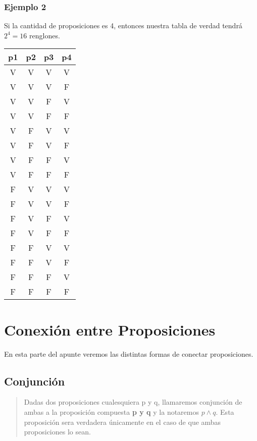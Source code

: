\documentclass[a4paper,11pt,oneside,titlepage,final]{scrartc}
\begin{document}
\subsubsection*{Ejemplo 2}

Si la cantidad de proposiciones es 4, entonces nuestra tabla de verdad tendrá $2^{4} = 16$ renglones.\\ 

\begin{tabular}{|c|c|c|c|}
\hline 
p1 & p2 & p3 & p4 \\ 
\hline 
V & V & V & V \\ 
\hline 
V & V & V & F \\ 
\hline 
V & V & F & V \\ 
\hline 
V & V & F & F \\ 
\hline 
V & F & V & V \\ 
\hline 
V & F & V & F \\ 
\hline 
V & F & F & V \\ 
\hline 
V & F & F & F \\ 
\hline 
F & V & V & V \\ 
\hline 
F & V & V & F \\ 
\hline 
F & V & F & V \\ 
\hline 
F & V & F & F \\ 
\hline 
F & F & V & V \\ 
\hline 
F & F & V & F \\ 
\hline 
F & F & F & V \\ 
\hline 
F & F & F & F \\ 
\hline 
\end{tabular} 



\newpage
\section{Conexión entre Proposiciones}

En esta parte del apunte veremos las distintas formas de conectar proposiciones.

\subsection{Conjunción}

\begin{quote}
Dadas dos proposiciones cualesquiera p y q, llamaremos conjunción de ambas a la proposición compuesta \textbf{p y q} y la notaremos $p \wedge q$. Esta proposición sera verdadera únicamente en el caso de que ambas proposiciones lo sean.\\
\end{quote}
\end{document}
